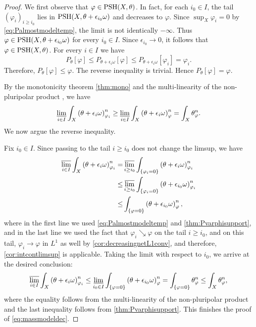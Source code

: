 \begin{proof}
        We first observe that $\varphi\in \mathrm{PSH}(X,\theta)$. In fact, for each $i_0\in I$, the tail $(\varphi_i)_{i\geq i_0}$ lies in $\mathrm{PSH}(X,\theta+\epsilon_{i_0}\omega)$ and decreases to $\varphi$. Since $\sup_X\varphi_i=0$ by \eqref{eq:Palmostmodeltemp}, the limit is not identically $-\infty$. Thus $\varphi\in \mathrm{PSH}(X,\theta+\epsilon_{i_0}\omega)$ for every $i_0\in I$. Since $\epsilon_{i_0}\to 0$, it follows that $\varphi\in \mathrm{PSH}(X,\theta)$.
        For every $i\in I$ we have
        \[
        P_{\theta}[\varphi]\leq P_{\theta+\epsilon_i\omega}[\varphi]\leq P_{\theta+\epsilon_i\omega}[\varphi_i]=\varphi_i.
        \]
        Therefore, $P_{\theta}[\varphi]\leq \varphi$. The reverse inequality is trivial. Hence $P_{\theta}[\varphi]=\varphi$.

        By the monotonicity theorem \cref{thm:mono} and the multi-linearity of the non-pluripolar product , we have
        \[
            \varliminf_{i\in I} \int_X \left(\theta + \epsilon_i \omega\right)^n_{\varphi_i} \geq  \varliminf_{i\in I} \int_X \left(\theta + \epsilon_i \omega\right)^n_{\varphi}  = \int_X \theta_{\varphi}^n.
        \]
        We now argue the reverse inequality.

        Fix $i_0\in I$. Since passing to the tail $i\geq i_0$ does not change the limsup, we have
        \[
            \begin{aligned}
                \varlimsup_{i\in I} \int_X \left(\theta + \epsilon_i \omega\right)^n_{\varphi_i}=&\varlimsup_{i\geq i_0} \int_{\left\{\varphi_i =0\right\}} \left(\theta + \epsilon_i \omega\right)^n_{\varphi_i} \\
                \leq & \varlimsup_{i\geq i_0} \int_{\left\{\varphi_i =0\right\}} \left(\theta + \epsilon_{i_0} \omega\right)^n_{\varphi_i}\\
                \leq & \int_{\left\{\varphi =0\right\}} \left(\theta + \epsilon_{i_0} \omega\right)^n_{\varphi},
            \end{aligned}
        \]
    where in the first line we used \eqref{eq:Palmostmodeltemp} and \cref{thm:Pvarphisupport}, and in the last line we used the fact that $\varphi_i \searrow \varphi$ on the tail $i\geq i_0$, and on this tail, $\varphi_i \to \varphi$ in $L^1$ as well by \cref{cor:decreasingnetL1conv}, and therefore, \cref{cor:intcontlimsup} is applicable. Taking the limit with respect to $i_0$, we arrive at the desired conclusion:
    \[
    \varlimsup_{i\in I} \int_{X} \left(\theta + \epsilon_i \omega \right)^n_{\varphi_i} \leq \varliminf_{i_0\in I}\int_{\{\varphi =0\}} \left(\theta + \epsilon_{i_0} \omega \right)^n_{\varphi}  =  \int_{\{\varphi =0\}} \theta^n_{\varphi} \leq \int_{X} \theta^n_{\varphi},
    \]
    where the equality follows from the multi-linearity of the non-pluripolar product  and the last inequality follows from \cref{thm:Pvarphisupport}.
    This finishes the proof of \eqref{eq:massmodeldec}.


\end{proof}
